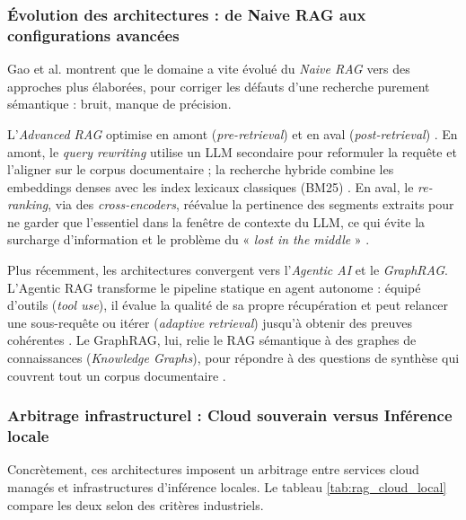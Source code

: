 \subsubsection{Évolution des architectures : de Naive RAG aux configurations avancées}

Gao et al. \cite{gaoRetrievalAugmentedGenerationLarge2024} montrent que le domaine a vite évolué du \textit{Naive RAG} vers des approches plus élaborées, pour corriger les défauts d'une recherche purement sémantique : bruit, manque de précision. 

L'\textit{Advanced RAG} optimise en amont (\textit{pre-retrieval}) et en aval (\textit{post-retrieval}) \cite{gaoRetrievalAugmentedGenerationLarge2024}. En amont, le \textit{query rewriting} utilise un LLM secondaire pour reformuler la requête et l'aligner sur le corpus documentaire ; la recherche hybride combine les embeddings denses avec les index lexicaux classiques (BM25) \cite{karpukhinDensePassageRetrieval2020}. En aval, le \textit{re-ranking}, via des \textit{cross-encoders}, réévalue la pertinence des segments extraits pour ne garder que l'essentiel dans la fenêtre de contexte du LLM, ce qui évite la surcharge d'information et le problème du « \textit{lost in the middle} » \cite{gaoRetrievalAugmentedGenerationLarge2024}.

Plus récemment, les architectures convergent vers l'\textit{Agentic AI} et le \textit{GraphRAG}. L'Agentic RAG transforme le pipeline statique en agent autonome : équipé d'outils (\textit{tool use}), il évalue la qualité de sa propre récupération et peut relancer une sous-requête ou itérer (\textit{adaptive retrieval}) jusqu'à obtenir des preuves cohérentes \cite{gaoRetrievalAugmentedGenerationLarge2024}. Le GraphRAG, lui, relie le RAG sémantique à des graphes de connaissances (\textit{Knowledge Graphs}), pour répondre à des questions de synthèse qui couvrent tout un corpus documentaire \cite{gaoRetrievalAugmentedGenerationLarge2024}.

\subsubsection{Arbitrage infrastructurel : Cloud souverain versus Inférence locale}

Concrètement, ces architectures imposent un arbitrage entre services cloud managés et infrastructures d'inférence locales. Le tableau \ref{tab:rag_cloud_local} compare les deux selon des critères industriels.


